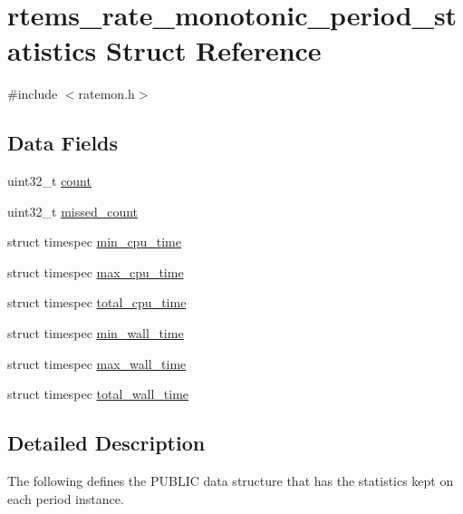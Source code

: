 \hypertarget{structrtems__rate__monotonic__period__statistics}{}\section{rtems\+\_\+rate\+\_\+monotonic\+\_\+period\+\_\+statistics Struct Reference}
\label{structrtems__rate__monotonic__period__statistics}


{\ttfamily \#include $<$ratemon.\+h$>$}

\subsection*{Data Fields}
\begin{DoxyCompactItemize}
\item 
uint32\+\_\+t \mbox{\hyperlink{structrtems__rate__monotonic__period__statistics_a2ba17968e46176b2565538a2c3be4b5e}{count}}
\item 
uint32\+\_\+t \mbox{\hyperlink{structrtems__rate__monotonic__period__statistics_a13df91044079d1497ab1d4c69274be94}{missed\+\_\+count}}
\item 
struct timespec \mbox{\hyperlink{structrtems__rate__monotonic__period__statistics_aa31b19ddaa85c8773c1aa116e58d965f}{min\+\_\+cpu\+\_\+time}}
\item 
struct timespec \mbox{\hyperlink{structrtems__rate__monotonic__period__statistics_a58deec682ffbc15d640aa176b068fb4c}{max\+\_\+cpu\+\_\+time}}
\item 
struct timespec \mbox{\hyperlink{structrtems__rate__monotonic__period__statistics_a209967fe6ee88a6599e0e2d77b827248}{total\+\_\+cpu\+\_\+time}}
\item 
struct timespec \mbox{\hyperlink{structrtems__rate__monotonic__period__statistics_a05b95a902f116b5f48779079f1a468bb}{min\+\_\+wall\+\_\+time}}
\item 
struct timespec \mbox{\hyperlink{structrtems__rate__monotonic__period__statistics_addc79def54e856cc1ab1e07ea50a1556}{max\+\_\+wall\+\_\+time}}
\item 
struct timespec \mbox{\hyperlink{structrtems__rate__monotonic__period__statistics_a759772098759efd12022beab812798f5}{total\+\_\+wall\+\_\+time}}
\end{DoxyCompactItemize}


\subsection{Detailed Description}
The following defines the P\+U\+B\+L\+IC data structure that has the statistics kept on each period instance.

